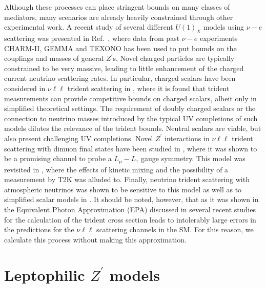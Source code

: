 Although these processes can place stringent bounds on many classes of mediators, many scenarios are already heavily constrained through other experimental work. A recent study of several different $U(1)_X$ models using $\nu-e$ scattering was presented in Ref.~\cite{Lindner:2018kjo}, where data from past $\nu-e$ experiments CHARM-II, GEMMA and TEXONO has been used to put bounds on the couplings and masses of general $Z^\prime$s. Novel charged particles are typically constrained to be very massive, leading to little enhancement of the charged current neutrino scattering rates. In particular, charged scalars have been considered in $\nu\ell\ell$ trident scattering in , where it is found that trident measurements can provide competitive bounds on charged scalars, albeit only in simplified theoretical settings. The requirement of doubly charged scalars or the connection to neutrino masses introduced by the typical UV completions of such models dilutes the relevance of the trident bounds. Neutral scalars are viable, but also present challenging UV completions. Novel $Z^\prime$ interactions in $\nu\ell\ell$ trident scattering with dimuon final states have been studied in , where it was shown to be a promising channel to probe a $L_\mu-L_\tau$ gauge symmetry. This model was revisited in , where the effects of kinetic mixing and the possibility of a measurement by T2K was alluded to. Finally, neutrino trident scattering with atmospheric neutrinos was shown to be sensitive to this model as well as to simplified scalar models in \cite{Ge:2017poy}. It should be noted, however, that as it was shown in  the Equivalent Photon Approximation (EPA) discussed in several recent studies \cite{Magill:2017mps, Kaneta:2016uyt} for the calculation of the trident cross section leads to intolerably large errors in the predictions for the $\nu\ell\ell$ scattering channels in the SM. For this reason, we calculate this process without making this approximation.


\section{\label{sec:models}Leptophilic $Z^\prime$ models}

